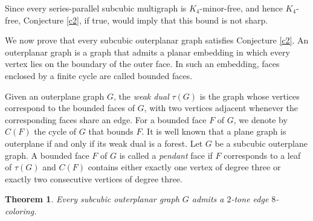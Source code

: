 \documentclass[12pt]{article}
\theoremstyle{plain}
\newtheorem{theorem}{Theorem}
\numberwithin{theorem}{section}
\numberwithin{conjecture}{section}
\numberwithin{corollary}{section}
\numberwithin{example}{section}
\numberwithin{lemma}{section}
\numberwithin{proposition}{section}
\numberwithin{problem}{section}
\numberwithin{remark}{section}
\numberwithin{claim}{theorem}
\numberwithin{definition}{section}
\begin{document}
Since every series-parallel subcubic multigraph is $K_4$-minor-free, and hence $K_4$-free, Conjecture \ref{c2}, if true, would imply that this bound is not sharp.

We now prove that every subcubic outerplanar graph satisfies Conjecture \ref{c2}. An outerplanar graph is a graph that admits a planar embedding in which every vertex lies on the boundary of the outer face. In such an embedding, faces enclosed by a finite cycle are called bounded faces.

Given an outerplane graph $G$, the \emph{weak dual} $\tau(G)$ is the graph whose vertices correspond to the bounded faces of $G$, with two vertices adjacent whenever the corresponding faces share an edge. For a bounded face $F$ of $G$, we denote by $C(F)$ the cycle of $G$ that bounds $F$. It is well known that a plane graph is outerplane if and only if its weak dual is a forest. Let $G$ be a subcubic outerplane graph. A bounded face $F$ of $G$ is called a \emph{pendant} face if $F$ corresponds to a leaf of $\tau(G)$ and $C(F)$ contains either exactly one vertex of degree three or exactly two consecutive vertices of degree three. 

\begin{theorem}\label{t7}
Every subcubic outerplanar graph $G$ admits a $2$-tone edge $8$-coloring.
\end{theorem}
\end{document}

